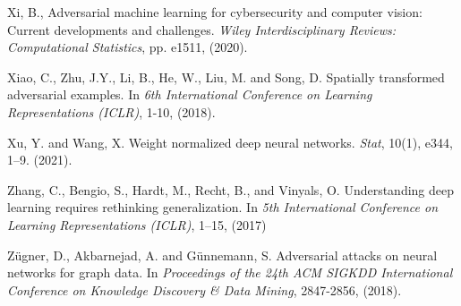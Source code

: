\documentclass[12pt]{article}
\begin{document}
\begin{thebibliography}{}
Xi, B., Adversarial machine learning for cybersecurity and computer
vision: Current developments and challenges. {\it Wiley Interdisciplinary
Reviews: Computational Statistics}, pp. e1511, (2020).
  
Xiao, C., Zhu, J.Y., Li, B., He, W., Liu, M. and Song, D. Spatially
transformed adversarial examples. In {\it 6th International Conference
  on Learning Representations (ICLR)}, 1-10, (2018).

  Xu, Y. and Wang, X.  Weight normalized deep neural
  networks. {\it Stat}, 10(1), e344, 1--9. (2021).
  
Zhang, C., Bengio, S., Hardt, M., Recht, B., and Vinyals, O.
Understanding deep learning requires rethinking generalization.
In {\it 5th International Conference
  on Learning Representations (ICLR)}, 1--15, (2017)  

Zügner, D., Akbarnejad, A. and Günnemann, S. Adversarial attacks on
neural networks for graph data. In {\it Proceedings of the 24th ACM SIGKDD
International Conference on Knowledge Discovery \& Data Mining},
2847-2856, (2018).

  
\end{thebibliography}
\end{document}
